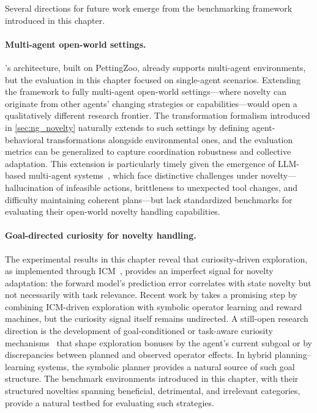 Several directions for future work emerge from the benchmarking framework introduced in this chapter.

\paragraph{Multi-agent open-world settings.} \NovelGym{}'s architecture, built on PettingZoo, already supports multi-agent environments, but the evaluation in this chapter focused on single-agent scenarios. Extending the framework to fully multi-agent open-world settings---where novelty can originate from other agents' changing strategies or capabilities---would open a qualitatively different research frontier. The transformation formalism introduced in \cref{sec:ng_novelty} naturally extends to such settings by defining agent-behavioral transformations alongside environmental ones, and the evaluation metrics can be generalized to capture coordination robustness and collective adaptation. This extension is particularly timely given the emergence of LLM-based multi-agent systems~\citep{wang2024survey,ahn2022can,huang2022language}, which face distinctive challenges under novelty---hallucination of infeasible actions, brittleness to unexpected tool changes, and difficulty maintaining coherent plans---but lack standardized benchmarks for evaluating their open-world novelty handling capabilities.

\paragraph{Goal-directed curiosity for novelty handling.} The experimental results in this chapter reveal that curiosity-driven exploration, as implemented through ICM~\citep{pathak2017curiosity}, provides an imperfect signal for novelty adaptation: the forward model's prediction error correlates with state novelty but not necessarily with task relevance. Recent work by \citet{lorang2025curiosity} takes a promising step by combining ICM-driven exploration with symbolic operator learning and reward machines, but the curiosity signal itself remains undirected. A still-open research direction is the development of goal-conditioned or task-aware curiosity mechanisms~\citep{liu2022goal} that shape exploration bonuses by the agent's current subgoal or by discrepancies between planned and observed operator effects. In hybrid planning--learning systems, the symbolic planner provides a natural source of such goal structure. The benchmark environments introduced in this chapter, with their structured novelties spanning beneficial, detrimental, and irrelevant categories, provide a natural testbed for evaluating such strategies.

